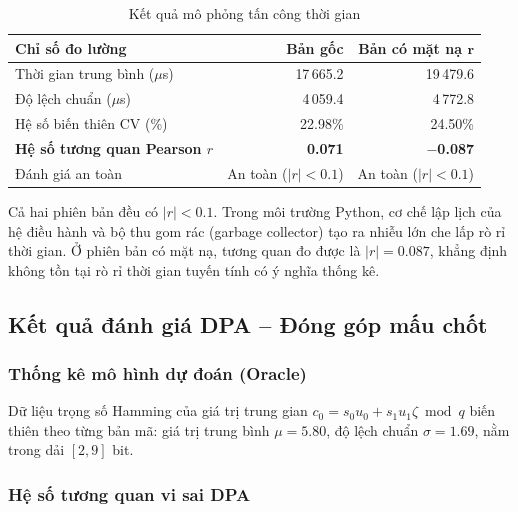 \documentclass[../LuanVan.tex]{subfiles}
\begin{document}
\begin{table}[H]
\centering
\caption{Kết quả mô phỏng tấn công thời gian}
\label{tab:timing_result}
\begin{tabular}{l r r}
\toprule
\textbf{Chỉ số đo lường} & \textbf{Bản gốc} & \textbf{Bản có mặt nạ $\mathbf{r}$} \\
\midrule
Thời gian trung bình ($\mu$s) & 17\,665.2 & 19\,479.6 \\
Độ lệch chuẩn ($\mu$s) & 4\,059.4 & 4\,772.8 \\
Hệ số biến thiên CV (\%) & 22.98\% & 24.50\% \\
\textbf{Hệ số tương quan Pearson $r$} & \textbf{0.071} & \textbf{$-$0.087} \\
\midrule
Đánh giá an toàn & An toàn ($|r| < 0.1$) & An toàn ($|r| < 0.1$) \\
\bottomrule
\end{tabular}
\end{table}

Cả hai phiên bản đều có $|r| < 0.1$. Trong môi trường Python, cơ chế lập lịch của hệ điều hành và bộ thu gom rác (garbage collector) tạo ra nhiễu lớn che lấp rò rỉ thời gian. Ở phiên bản có mặt nạ, tương quan đo được là $|r| = 0.087$, khẳng định không tồn tại rò rỉ thời gian tuyến tính có ý nghĩa thống kê.


\subsection{Kết quả đánh giá DPA -- Đóng góp mấu chốt}

\subsubsection{Thống kê mô hình dự đoán (Oracle)}

Dữ liệu trọng số Hamming của giá trị trung gian $c_0 = s_0 u_0 + s_1 u_1 \zeta \bmod q$ biến thiên theo từng bản mã: giá trị trung bình $\mu = 5.80$, độ lệch chuẩn $\sigma = 1.69$, nằm trong dải $[2, 9]$ bit.

\subsubsection{Hệ số tương quan vi sai DPA}
\end{document}
